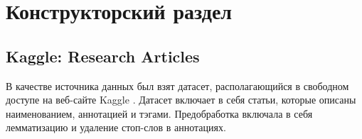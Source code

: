 \section{Конструкторский раздел}

\subsection{Kaggle: Research Articles}

В качестве источника данных был взят датасет, располагающийся в свободном доступе на веб-сайте Kaggle \cite{dataset}. Датасет включает в себя статьи, которые описаны наименованием, аннотацией и тэгами. Предобработка включала в себя лемматизацию и удаление стоп-слов в аннотациях.

\pagebreak